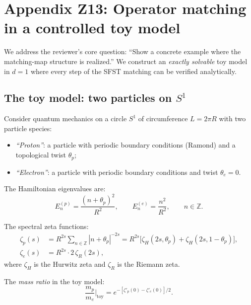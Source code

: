 
\section{Appendix Z13: Operator matching in a controlled toy model}
\label{app:toymodel}

We address the reviewer's core question: ``Show a concrete example
where the matching-map structure is realized.'' We construct an
\emph{exactly solvable} toy model in $d=1$ where every step of the
SFST matching can be verified analytically.

\subsection{The toy model: two particles on $S^1$}

Consider quantum mechanics on a circle $S^1$ of circumference $L=2\pi R$
with two particle species:
\begin{itemize}[nosep]
\item \emph{``Proton''}: a particle with periodic boundary conditions
  (Ramond) and a topological twist $\theta_p$;
\item \emph{``Electron''}: a particle with periodic boundary conditions
  and twist $\theta_e=0$.
\end{itemize}

The Hamiltonian eigenvalues are:
\begin{equation}
  E_n^{(p)} = \frac{(n+\theta_p)^2}{R^2},\qquad
  E_n^{(e)} = \frac{n^2}{R^2},\qquad n\in\mathbb{Z}.
\end{equation}

The spectral zeta functions:
\begin{align}
  \zeta_p(s) &= R^{2s}\sum_{n\in\mathbb{Z}}|n+\theta_p|^{-2s}
    = R^{2s}\bigl[\zeta_H(2s,\theta_p)+\zeta_H(2s,1-\theta_p)\bigr],\\
  \zeta_e(s) &= R^{2s}\cdot 2\,\zeta_R(2s),
\end{align}
where $\zeta_H$ is the Hurwitz zeta and $\zeta_R$ is the Riemann zeta.

The \emph{mass ratio} in the toy model:
\begin{equation}\label{eq:toy_ratio}
  \frac{m_p}{m_e}\bigg|_{\mathrm{toy}}
  = e^{-[\zeta'_p(0)-\zeta'_e(0)]/2}.
\end{equation}

